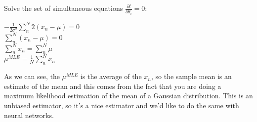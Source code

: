 Solve the set of simultaneous equations $\frac{\partial l}{\partial\theta_i}=0$:
\begin{center}
    $-\frac{1}{2 \sigma^{2}} \sum_{n}^{N} 2\left(x_{n}-\mu\right)=0$ \\ $\sum_{n}^{N}\left(x_{n}-\mu\right)=0$ \\
    $\sum_{n}^{N} x_{n}=\sum_{n}^{N} \mu $ \\
    \vspace{0.5cm}
    $\mu^{M L E}=\frac{1}{N} \sum_{n}^{N} x_{n}$
\end{center}
As we can see, the $\mu^{MLE}$ is the average of the $x_n$, so the sample mean is an estimate of the mean and this comes from the fact that you are doing a maximum likelihood estimation of the mean of a Gaussian distribution. This is an unbiased estimator, so it's a nice estimator and we'd like to do the same with neural networks.

